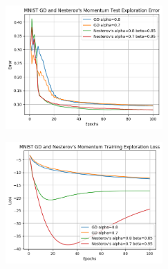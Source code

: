 \documentclass[10pt]{article}
\begin{document}
\begin{multicols}{2}
\begin{center}
    \includegraphics[width=0.45\textwidth]{GDandNesterov'sMomentumTestExplorationError.png}
\end{center}
\begin{center}
    \includegraphics[width=0.45\textwidth]{GDandNesterov'sMomentumTrainingExplorationLoss.png}
\end{center}


\end{multicols}
\end{document}
